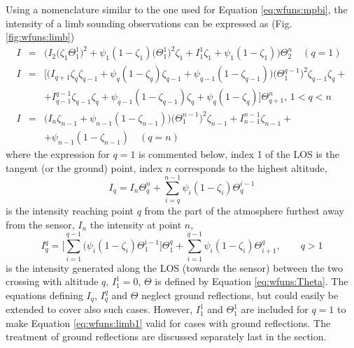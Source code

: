  Using a nomenclature similar to the one used for Equation
 \ref{eq:wfuns:mpbi}, the intensity of a limb sounding
 observations can be expressed as (Fig. \ref{fig:wfuns:limb})
 \begin{eqnarray}
   I & = & \Big(I_2 \Big( \zeta_1\Theta^1_1 \Big)^2 + \psi_1(1-\zeta_1)
            \Big( \Theta^1_1 \Big)^2 \zeta_1+
            I_1^1\zeta_1+\psi_1(1-\zeta_1) \Big)\Theta^n_{2} \quad (q=1) 
        \nonumber \\
   I & = & \Big[\Big(I_{q+1}\zeta_q\zeta_{q-1} +\psi_q(1-\zeta_q)\zeta_{q-1} + 
           \psi_{q-1}(1-\zeta_{q-1})\Big)\Big(\Theta^{q-1}_{1}\Big)^2
           \zeta_{q-1}\zeta_q + \nonumber \\
      & & + I_{q-1}^{q-1}\zeta_{q-1}\zeta_q + \psi_{q-1}(1-\zeta_{q-1})
           \zeta_q + \psi_q(1-\zeta_q) \Big] \Theta^n_{q+1}, \, 1<q<n
  \label{eq:wfuns:limb1}  \\
   I & = & \Big(I_n\zeta_{n-1}+\psi_{n-1}(1-\zeta_{n-1})\Big)\Big
           (\Theta^{n-1}_{1}\Big)^2\zeta_{n-1} + I_{n-1}^{n-1}\zeta_{n-1} +
             \nonumber \\
      & &  +   \psi_{n-1}(1-\zeta_{n-1}) \quad (q=n) \nonumber
 \end{eqnarray}
 where the expression for $q=1$ is commented below, index 1 of the LOS
 is the tangent (or the ground) point, index $n$ corresponds to the
 highest altitude,
 \begin{equation}
   I_q = I_n \Theta^{n}_{q} + \sum_{i=q}^{n-1}\psi_i(1-\zeta_i) 
             \Theta_{q}^{i-1}
  \label{eq:wfuns:iqq}
 \end{equation}
 is the intensity reaching point $q$ from the part of the
 atmosphere furthest away from the sensor, $I_n$ the intensity at point $n$,
 \begin{equation}
   I_q^q = \Big[ \sum_{i=1}^{q-1}(\psi_i(1-\zeta_i)\Theta_{1}^{i-1}\Big]
             \Theta_{1}^{q} + \sum_{i=1}^{q-1}\psi_i(1-\zeta_i)
            \Theta_{i+1}^{q}, \qquad q>1
 \end{equation}
 is the intensity generated along the LOS (towards the sensor) between
 the two crossing with altitude $q$, $I_1^1=0$, $\Theta$ is defined by
 Equation \ref{eq:wfuns:Theta}. The equations defining $I_q$, $I_q^q$
 and $\Theta$ neglect ground reflections, but could easily be extended
 to cover also such cases. However, $I_1^1$ and $\Theta_1^1$ are
 included for $q=1$ to make Equation \ref{eq:wfuns:limb1} valid for
 cases with ground reflections. The treatment of ground reflections
 are discussed separately last in the section.

